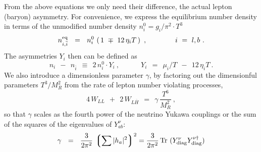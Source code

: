 \documentclass[12pt]{revtex4}
\newcommand{\eq}{{\rm eq}}
\newcommand{\lgr}{\left\lgroup}
\newcommand{\rgr}{\right\rgroup}
\newcommand{\Mpl}{M_{\rm Pl}}
\newcommand{\ov}{\overline}
\begin{document}
	From the above equations we only need their difference, the actual
	lepton (baryon) asymmetry.
	For convenience, we express the equilibrium number density in terms
	of the unmodified number density 
	$ n_i^0 = g_i/\pi^2 \cdot T^3 $
\[
	n_{i,\ov{i}}^\eq ~~=~~ n_i^0\, \left(\, 1 ~\mp~ 12\,\eta_i T \,\right)~,
	\qquad\qquad{i ~=~ l, b}~.
\]
	The asymmetries $ Y_i $ then can be defined as
\[
	n_i ~~-~~ n_{\ov{i}} ~~\equiv~~ 2\, n_i^0 \cdot Y_i~,
	\qquad\quad Y_i ~~=~~ \mu_i/T ~~-~~ 12\,\eta_i T~.
\]
	We also introduce a dimensionless parameter $ \gamma $, 
	by factoring out the dimensionful parameters $T^3/M_R^2$ from
	the rate of lepton number violating processes,
\begin{equation*}
	4\, W_{LL} ~~+~~ 2\, W_{L\ov{H}} ~~=~~ 
		 \gamma\, \frac{T^6}{M_R^2}~,
\end{equation*}
so that $\gamma$ scales as the fourth power of the neutrino Yukawa couplings or the 
sum of the squares of the eigenvalues of $Y_{ab}^\nu$: 
\begin{equation}
\label{gamma}
	\gamma  ~~=~~ \frac{3}{2\pi^2}\, \lgr \sum |h_a|^2 \rgr^2 = \frac{3}{2\pi^2}\, {\rm Tr}~ (Y^\nu_{\rm diag}
Y^{\nu\dagger}_{\rm diag})
\end{equation}
\end{document}
